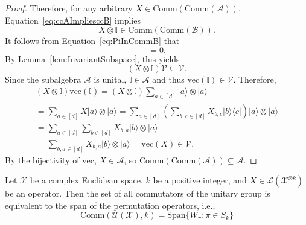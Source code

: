 \begin{proof}
Therefore, for any arbitrary $X \in \text{Comm}(\text{Comm}(\mathcal{A}))$, Equation~\ref{eq:ccAImpliesccB} implies
\begin{equation}
    X \otimes \mathbb{I} \in \text{Comm}(\text{Comm}(\mathcal{B})).
\end{equation}
It follows from Equation~\ref{eq:PiInCommB} that
\begin{equation}
    [X \otimes \mathbb{I}, \Pi_{\mathcal{V}}] = 0.
\end{equation}
By Lemma~\ref{lem:InvariantSubspace}, this yields
\begin{equation}
    (X \otimes \mathbb{I})\mathcal{V} \subseteq \mathcal{V}.
\end{equation}
Since the subalgebra $\mathcal{A}$ is unital, $\mathbb{I} \in \mathcal{A}$ and thus $\text{vec}(\mathbb{I}) \in \mathcal{V}$.
Therefore,
\begin{equation}
\begin{split}
    (X \otimes \mathbb{I}) \text{vec}(\mathbb{I})
    = (X \otimes \mathbb{I}) \sum_{a \in [d]} |a\rangle \otimes |a \rangle\\
    = \sum_{a \in [d]} X|a\rangle \otimes |a\rangle
    = \sum_{a \in [d]} \left( \sum_{b, c \in [d]} X_{b, c} |b \rangle \langle c| \right) |a \rangle \otimes |a \rangle\\
    = \sum_{a \in [d]} \sum_{b \in [d]} X_{b, a} |b \rangle \otimes |a \rangle\\
    = \sum_{b, a \in [d]} X_{b, a} |b \rangle \otimes |a \rangle
    = \text{vec}(X) \in \mathcal{V}.
\end{split}
\end{equation}
By the bijectivity of $\text{vec}$, $X \in \mathcal{A}$, so $\text{Comm}(\text{Comm}(\mathcal{A})) \subseteq \mathcal{A}$.
\end{proof}



\begin{theorem}\label{thm:SchurWeylDuality}
    Let $\mathcal{X}$ be a complex Euclidean space, $k$ be a positive integer, and $X \in \mathcal{L}(\mathcal{X}^{\otimes k})$ be an operator.
    Then the set of all commutators of the unitary group is equivalent to the span of the permutation operators, i.e.,
    \begin{equation}
        \text{Comm}(\mathcal{U}(\mathcal{X}), k) = \text{Span}\{W_{\pi} : \pi \in S_k \}
    \end{equation}
\end{theorem}

